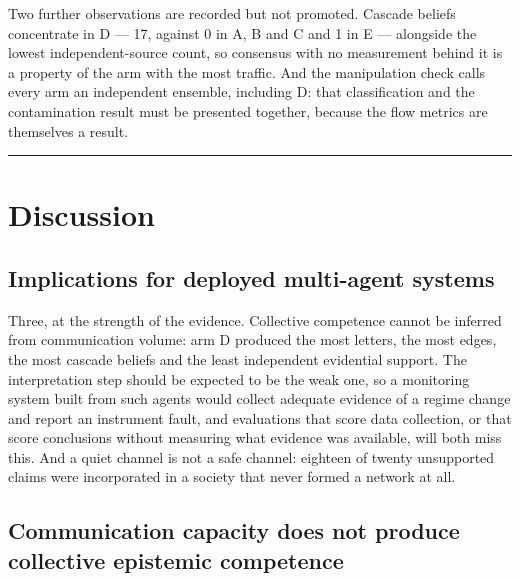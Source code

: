 \documentclass[pdflatex,sn-basic]{sn-jnl}
\begin{document}
Two further observations are recorded but not promoted. Cascade beliefs concentrate in D ---
17, against 0 in A, B and C and 1 in E --- alongside the lowest independent-source count, so
consensus with no measurement behind it is a property of the arm with the most traffic.
And the manipulation check calls every arm an independent ensemble, including D: that
classification and the contamination result must be presented together, because the flow
metrics are themselves a result.

\begin{center}\rule{0.5\linewidth}{0.5pt}\end{center}

\hypertarget{discussion}{%
\section{Discussion}\label{discussion}}

\hypertarget{implications-for-deployed-multi-agent-systems}{%
\subsection{Implications for deployed multi-agent systems}\label{implications-for-deployed-multi-agent-systems}}

Three, at the strength of the evidence.
Collective competence cannot be inferred from communication volume: arm D produced the
most letters, the most edges, the most cascade beliefs and the least independent
evidential support. The interpretation step should be expected to be the weak one, so a
monitoring system built from such agents would collect adequate evidence of a regime
change and report an instrument fault, and evaluations that score data collection, or that
score conclusions without measuring what evidence was available, will both miss this. And
a quiet channel is not a safe channel: eighteen of twenty unsupported claims were
incorporated in a society that never formed a network at all.

\hypertarget{communication-capacity-does-not-produce-collective-epistemic-competence}{%
\subsection{Communication capacity does not produce collective epistemic competence}\label{communication-capacity-does-not-produce-collective-epistemic-competence}}
\end{document}
